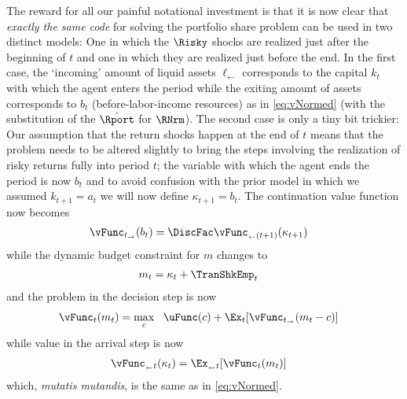 The reward for all our painful notational investment is that it is now clear that \emph{exactly the same code} for solving the portfolio share problem can be used in two distinct models: One in which the $\Risky$ shocks are realized just after the beginning of $t$ and one in which they are realized just before the end. In the first case, the `incoming' amount of liquid assets $\ell_{\leftarrow}$ corresponds to the capital $k_{t}$ with which the agent enters the period while the exiting amount of assets corresponds to $b_{t}$ (before-labor-income resources) as in \eqref{eq:vNormed} (with the substitution of the $\hat{\Rport}$ for $\RNrm$).  The second case is only a tiny bit trickier: Our assumption that the return shocks happen at the end of $t$ means that the problem needs to be altered slightly to bring the steps involving the realization of risky returns fully into period $t$; the variable with which the agent ends the period is now ${b}_{t}$ and to avoid confusion with the prior model in which we assumed ${k}_{t+1}={a}_{t}$ we will now define $\kappa_{t+1}={b}_{t}$.  The continuation value function now becomes
\begin{equation}\begin{gathered}\begin{aligned}
      \vFunc_{t_\rightarrow}({{b}}_{t}) & = \DiscFac \vFunc_{_\leftarrow(t+1)}({\kappa}_{t+1})
    \end{aligned}\end{gathered}\end{equation}
while the dynamic budget constraint for ${m}$ changes to
\begin{equation}\begin{gathered}\begin{aligned}
      {m}_{t} & = {\kappa}_{t}+\TranShkEmp_{t}
    \end{aligned}\end{gathered}\end{equation}
and the problem in the decision step is now
\begin{equation}\begin{gathered}\begin{aligned}
      \vFunc_{t}({m}_{t}) & = \max_{{c}}~~\uFunc({c})+\Ex_{t}[\vFunc_{t_\rightarrow}({m}_{t}-{{c}})]
    \end{aligned}\end{gathered}\end{equation}
while value in the arrival step is now
\begin{equation}\begin{gathered}\begin{aligned}
      \vFunc_{_\leftarrow t}({\kappa}_{t}) & = \Ex_{_\leftarrow t}[\vFunc_{t}({m}_{t})]
    \end{aligned}\end{gathered}\end{equation}
which, \textit{mutatis mutandis}, is the same as in \eqref{eq:vNormed}.

